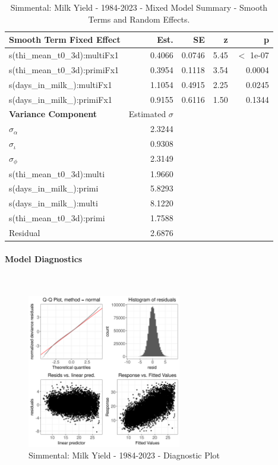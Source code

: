 \newpage
\begin{table}[H]
\centering
\begin{tabular}
{l | r | r | r | r}
\textbf{Smooth Term Fixed Effect} & Est. & SE & z & p\\
\hline
\hline
s(thi\_mean\_t0\_3d):multiFx1 & 0.4066 & 0.0746 & 5.45 & $<$ 1e-07\\
s(thi\_mean\_t0\_3d):primiFx1 & 0.3954 & 0.1118 & 3.54 & 0.0004\\
s(days\_in\_milk\_):multiFx1 & 1.1054 & 0.4915 & 2.25 & 0.0245\\
s(days\_in\_milk\_):primiFx1 & 0.9155 & 0.6116 & 1.50 & 0.1344\\
\hline
\textbf{Variance Component} & Estimated $\sigma$ & & & \\
\hline
\hline
$\sigma_\alpha$ & 2.3244 & & & \\
$\sigma_\iota$ & 0.9308 & & & \\
$\sigma_\phi$ & 2.3149 & & & \\
s(thi\_mean\_t0\_3d):multi &  1.9660 & & & \\
s(days\_in\_milk\_):primi & 5.8293 & & & \\
s(days\_in\_milk\_):multi & 8.1220 & & & \\
s(thi\_mean\_t0\_3d):primi & 1.7588 & & & \\
Residual & 2.6876 & & & \\
\end{tabular}
\caption[]{Simmental: Milk Yield - 1984-2023 - Mixed Model Summary - Smooth Terms and Random Effects.}
\end{table}

\paragraph{Model Diagnostics} \quad \\
\begin{figure}[H]
    \centering
    \includegraphics[width=0.6\textwidth]{thesis/figures/models/milk/full/si_milk_full/si_milk_full_diagnostics.png}
    \caption[]{Simmental: Milk Yield - 1984-2023 - Diagnostic Plot}
\end{figure}

